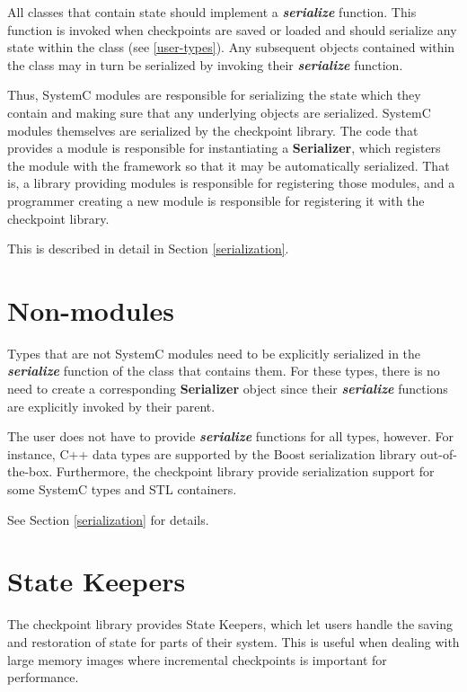 \documentclass[oneside]{memoir}
\begin{document}
All classes that contain state should implement a \textit{\textbf{serialize}} function.
This function is invoked when checkpoints are saved or loaded and should serialize any state within the class (see \ref{user-types}).
Any subsequent objects contained within the class may in turn be serialized by invoking their \textit{\textbf{serialize}} function.

Thus, SystemC modules are responsible for serializing the state which they contain and making sure that any underlying objects are serialized.
SystemC modules themselves are serialized by the checkpoint library.
The code that provides a module is responsible for instantiating a \textbf{Serializer}, which registers the module with the framework so that it may be automatically serialized.
That is, a library providing modules is responsible for registering those modules, and a programmer creating a new module is responsible for registering it with the checkpoint library.

This is described in detail in Section \ref{serialization}.

\section{Non-modules}
\label{overview-other}

Types that are not SystemC modules need to be explicitly serialized in the \textit{\textbf{serialize}} function of the class that contains them.
For these types, there is no need to create a corresponding \textbf{Serializer} object since their \textit{\textbf{serialize}} functions are explicitly invoked by their parent.

The user does not have to provide \textit{\textbf{serialize}} functions for all types, however.
For instance, C++ data types are supported by the Boost serialization library out-of-the-box.
Furthermore, the checkpoint library provide serialization support for some SystemC types and STL containers.

See Section \ref{serialization} for details.

\section{State Keepers}
\label{overview-state-keepers}

The checkpoint library provides State Keepers, which let users handle the saving and restoration of state for parts of their system.
This is useful when dealing with large memory images where incremental checkpoints is important for performance.
\end{document}
